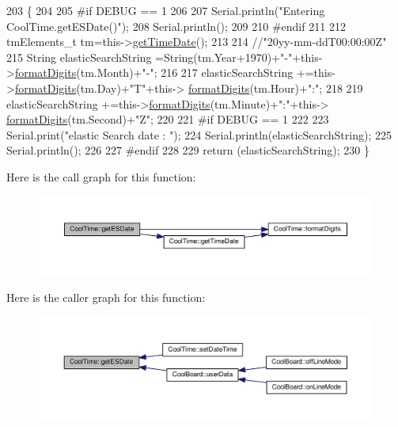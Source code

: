 \begin{DoxyCode}
203 \{
204 
205 \textcolor{preprocessor}{#if DEBUG == 1 }
206 
207     Serial.println(\textcolor{stringliteral}{"Entering CoolTime.getESDate()"});
208     Serial.println();
209 
210 \textcolor{preprocessor}{#endif }
211 
212     tmElements\_t tm=this->\hyperlink{classCoolTime_a7a7501c5ca77dd1248bea704c44f986c}{getTimeDate}();
213 
214     \textcolor{comment}{//"20yy-mm-ddT00:00:00Z"}
215     String elasticSearchString =String(tm.Year+1970)+\textcolor{stringliteral}{"-"}+this->\hyperlink{classCoolTime_acd537cd4210d7bde4e1f5c47d2ac0456}{formatDigits}(tm.Month)+\textcolor{stringliteral}{"-"};
216 
217     elasticSearchString +=this->\hyperlink{classCoolTime_acd537cd4210d7bde4e1f5c47d2ac0456}{formatDigits}(tm.Day)+\textcolor{stringliteral}{"T"}+this->
      \hyperlink{classCoolTime_acd537cd4210d7bde4e1f5c47d2ac0456}{formatDigits}(tm.Hour)+\textcolor{stringliteral}{":"};
218     
219     elasticSearchString +=this->\hyperlink{classCoolTime_acd537cd4210d7bde4e1f5c47d2ac0456}{formatDigits}(tm.Minute)+\textcolor{stringliteral}{":"}+this->
      \hyperlink{classCoolTime_acd537cd4210d7bde4e1f5c47d2ac0456}{formatDigits}(tm.Second)+\textcolor{stringliteral}{"Z"};
220 
221 \textcolor{preprocessor}{#if DEBUG == 1 }
222 
223     Serial.print(\textcolor{stringliteral}{"elastic Search date : "});
224     Serial.println(elasticSearchString);
225     Serial.println();
226 
227 \textcolor{preprocessor}{#endif}
228 
229     \textcolor{keywordflow}{return} (elasticSearchString);
230 \}
\end{DoxyCode}
Here is the call graph for this function\+:
\nopagebreak
\begin{figure}[H]
\begin{center}
\leavevmode
\includegraphics[width=350pt]{classCoolTime_ac4f32ee513c1328d984306645e8785a4_cgraph}
\end{center}
\end{figure}
Here is the caller graph for this function\+:
\nopagebreak
\begin{figure}[H]
\begin{center}
\leavevmode
\includegraphics[width=350pt]{classCoolTime_ac4f32ee513c1328d984306645e8785a4_icgraph}
\end{center}
\end{figure}
\mbox{\label{classCoolTime_a5d17f707a9d337720493b2bce9d41c21}} 

